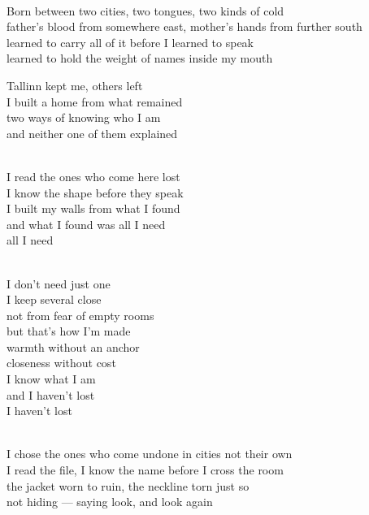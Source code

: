 \begin{lyrics}

\\
Born between two cities, two tongues, two kinds of cold\\
father's blood from somewhere east, mother's hands from further south\\
learned to carry all of it before I learned to speak\\
learned to hold the weight of names inside my mouth

Tallinn kept me, others left\\
I built a home from what remained\\
two ways of knowing who I am\\
and neither one of them explained

\\
I read the ones who come here lost\\
I know the shape before they speak\\
I built my walls from what I found\\
and what I found was all I need\\
all I need

\\
I don't need just one\\
I keep several close\\
not from fear of empty rooms\\
but that's how I'm made\\
warmth without an anchor\\
closeness without cost\\
I know what I am\\
and I haven't lost\\
I haven't lost

\\
I chose the ones who come undone in cities not their own\\
I read the file, I know the name before I cross the room\\
the jacket worn to ruin, the neckline torn just so\\
not hiding — saying look, and look again


\end{lyrics}
